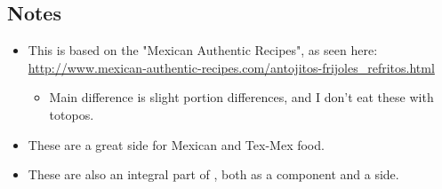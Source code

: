 \begin{multicols}{2}
\subsection*{Notes}
\begin{itemize}
    \item This is based on the "Mexican Authentic Recipes", as seen here: \url{http://www.mexican-authentic-recipes.com/antojitos-frijoles_refritos.html}
    \begin{itemize}
        \item Main difference is slight portion differences, and I don't eat these with totopos.
    \end{itemize}
    \item These are a great side for Mexican and Tex-Mex food.
    \item These are also an integral part of , both as a component and a side.
\end{itemize}
\end{multicols}
\clearpage